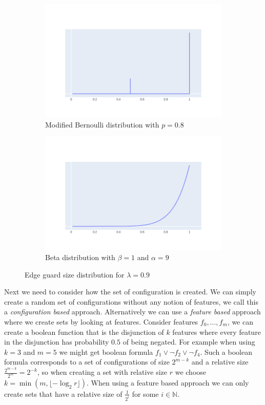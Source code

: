 \begin{figure}[H]
\centering
\begin{subfigure}{.5\textwidth}
	\centering
	\includegraphics[width=\linewidth]{Dists/Bernoulli90.png}
	\caption{Modified Bernoulli distribution with $p=0.8$}
\end{subfigure}%
\begin{subfigure}{.5\textwidth}
	\centering
	\includegraphics[width=\linewidth]{Dists/Beta90.png}
	\caption{Beta distribution with $\beta=1$ and $\alpha=9$}
\end{subfigure}
\caption{Edge guard size distribution for $\lambda = 0.9$}
\label{fig:dist_lambda90}
\end{figure}

Next we need to consider how the set of configuration is created. We can simply create a random set of configurations without any notion of features, we call this a \textit{configuration based} approach. Alternatively we can use a \textit{feature based} approach where we create sets by looking at features. Consider features $f_0, \dots, f_m$, we can create a boolean function that is the disjunction of $k$ features where every feature in the disjunction has probability $0.5$ of being negated.  For example when using $k=3$ and $m=5$ we might get boolean formula $f_1 \vee \neg f_2 \vee \neg f_4$. Such a boolean formula corresponds to a set of configurations of size $2^{m-k}$ and a relative size $\frac{2^{m-k}}{2^m} = 2^{-k}$, so when creating a set with relative size $r$ we choose $k = \min(m, \lfloor -\log_2{r} \rfloor)$. When using a feature based approach we can only create sets that have a relative size of $\frac{1}{2^i}$ for some $i \in \mathbb{N}$.

